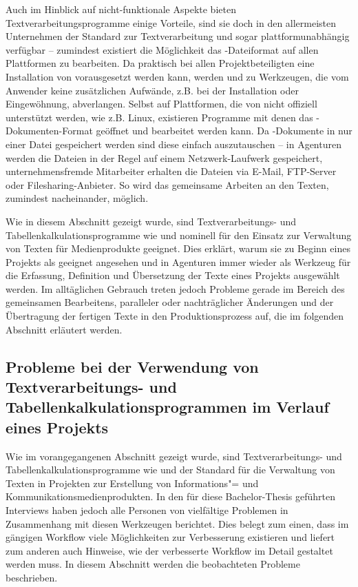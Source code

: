 \bigskip

Auch im Hinblick auf nicht-funktionale Aspekte bieten Textverarbeitungsprogramme einige Vorteile, sind sie doch in den allermeisten Unternehmen der Standard zur Textverarbeitung und sogar plattformunabhängig verfügbar -- zumindest existiert die Möglichkeit das -Dateiformat auf allen Plattformen zu bearbeiten. Da praktisch bei allen Projektbeteiligten eine Installation von  vorausgesetzt werden kann, werden  und  zu  Werkzeugen, die vom Anwender keine zusätzlichen Aufwände, z.B. bei der Installation oder Eingewöhnung, abverlangen. Selbst auf Plattformen, die von  nicht offiziell unterstützt werden, wie z.B. Linux, existieren Programme mit denen das -Dokumenten-Format geöffnet und bearbeitet werden kann. Da -Dokumente in nur einer Datei gespeichert werden sind diese einfach auszutauschen -- in Agenturen werden die Dateien in der Regel auf einem Netzwerk-Laufwerk gespeichert, unternehmensfremde Mitarbeiter erhalten die Dateien via E-Mail, FTP-Server oder Filesharing-Anbieter. So wird das gemeinsame Arbeiten an den Texten, zumindest nacheinander, möglich. 

\secbar

Wie in diesem Abschnitt gezeigt wurde, sind Textverarbeitungs- und Tabellenkalkulationsprogramme wie   und  nominell für den Einsatz zur Verwaltung von Texten für Medienprodukte geeignet. Dies erklärt, warum sie zu Beginn eines Projekts als geeignet angesehen und in Agenturen immer wieder als Werkzeug für die Erfassung, Definition und Übersetzung der Texte eines Projekts ausgewählt werden. Im alltäglichen Gebrauch treten jedoch Probleme gerade im Bereich des gemeinsamen Bearbeitens, paralleler oder nachträglicher Änderungen und der Übertragung der fertigen Texte in den Produktionsprozess auf, die im folgenden Abschnitt erläutert werden.

\pagebreak

\subsection{Probleme bei der Verwendung von Textverarbeitungs- und Tabellenkalkulationsprogrammen im Verlauf eines Projekts}
\label{l:officeprobleme}

Wie im vorangegangenen Abschnitt gezeigt wurde, sind Textverarbeitungs- und Tabellenkalkulationsprogramme wie   und  der Standard für die Verwaltung von Texten in Projekten zur Erstellung von Informations"= und Kommunikationsmedienprodukten. In den für diese Bachelor-Thesis geführten Interviews haben jedoch alle Personen von vielfältige Problemen in Zusammenhang mit diesen Werkzeugen berichtet. Dies belegt zum einen, dass im gängigen Workflow viele Möglichkeiten zur Verbesserung existieren und liefert zum anderen auch Hinweise, wie der verbesserte Workflow im Detail gestaltet werden muss. In diesem Abschnitt werden die beobachteten Probleme beschrieben.

